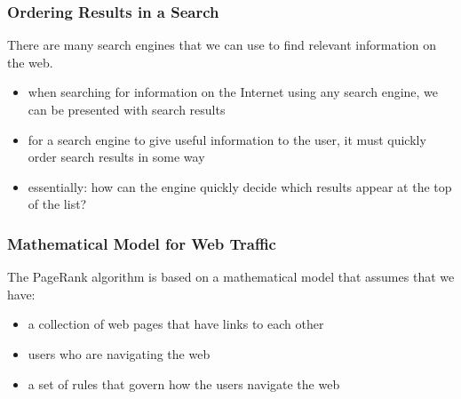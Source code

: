 \begin{frame}\frametitle{Ordering Results in a Search}

    There are many search engines that we can use to find relevant information on the web. 
    
    \pause 
    
    \begin{itemize}
        \item<2-> when searching for information on the Internet using any search engine, we can be presented with  search results
        \item<3-> for a search engine to give useful information to the user, it must quickly order search results in some way 
        \item<4-> essentially: how can the engine quickly decide which results appear at the top of the list? 
    \end{itemize}
    
    \vspace{12pt}
    
\end{frame}



\begin{frame}\frametitle{Mathematical Model for Web Traffic}

    The PageRank algorithm is based on a mathematical model that assumes that we have:
    
    \begin{itemize}
        \item<2-> a collection of web pages that have links to each other
        \item<3-> users who are navigating the web
        \item<4-> a set of rules that govern how the users navigate the web
    \end{itemize}
\end{frame}



